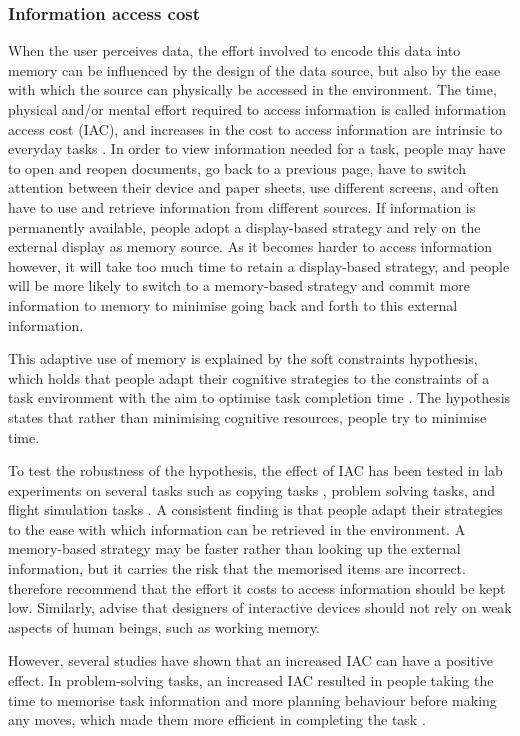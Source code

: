 \subsubsection{Information access cost}
When the user perceives data, the effort involved to encode this data into memory can be influenced by the design of the data source, but also by the ease with which the source can physically be accessed in the environment. The time, physical and/or mental effort required to access information is called information access cost (IAC), and increases in the cost to access information are intrinsic to everyday tasks \citep{Morgan2009, Waldron2011}. In order to view information needed for a task, people may have to open and reopen documents, go back to a previous page, have to switch attention between their device and paper sheets, use different screens, and often have to use and retrieve information from different sources. If information is permanently available, people adopt a display-based strategy and rely on the external display as memory source. As it becomes harder to access information however, it will take too much time to retain a display-based strategy, and people will be more likely to switch to a memory-based strategy and commit more information to memory to minimise going back and forth to this external information.

This adaptive use of memory is explained by the soft constraints hypothesis, which holds that people adapt their cognitive strategies to the constraints of a task environment with the aim to optimise task completion time \citep{Gray2006}. The hypothesis states that rather than minimising cognitive resources, people try to minimise time. 

To test the robustness of the hypothesis, the effect of IAC has been tested in lab experiments on several tasks such as copying tasks \citep[e.g.][]{Gray2006}, problem solving tasks\citep[e.g.][]{Morgan2012}, and flight simulation tasks \citep{Waldron2007}. A consistent finding is that people adapt their strategies to the ease with which information can be retrieved in the environment.  A memory-based strategy may be faster rather than looking up the external information, but it carries the risk that the memorised items are incorrect. \citet{Gray2006} therefore recommend that the effort it costs to access information should be kept low. Similarly, \citet{Kohn2000} advise that designers of interactive devices should not rely on weak aspects of human beings, such as working memory.

However, several studies have shown that an increased IAC can have a positive effect. In problem-solving tasks, an increased IAC resulted in people taking the time to memorise task information and more planning behaviour before making any moves, which made them more efficient in completing the task \citep[e.g.][]{Morgan2007, Morgan2012}. 

